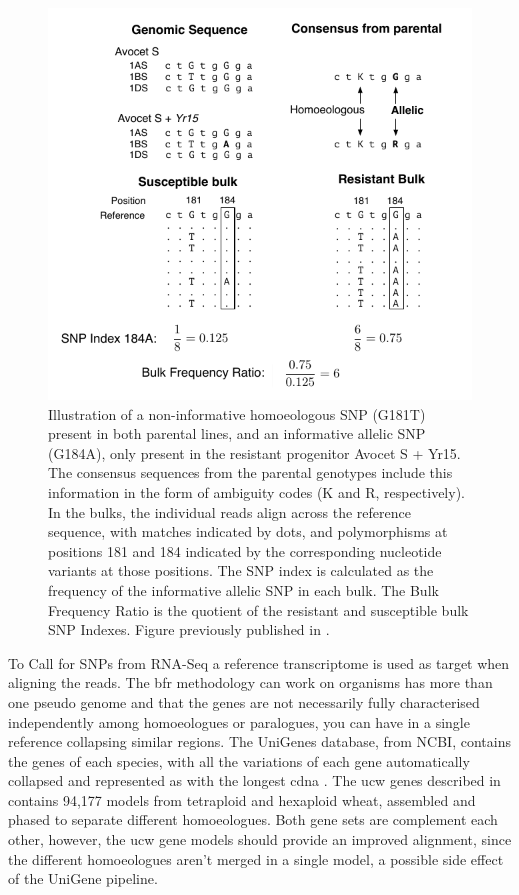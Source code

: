 \begin{figure}
\includegraphics[width=1\textwidth]{Yr15/Figures/bfr.pdf}
\caption{Illustration of a non-informative homoeologous SNP (G181T) present in both parental lines, and an informative allelic SNP (G184A), only present in the resistant progenitor Avocet S + Yr15. The consensus sequences from the parental genotypes include this information in the form of ambiguity codes (K and R, respectively). In the bulks, the individual reads align across the reference sequence, with matches indicated by dots, and polymorphisms at positions 181 and 184 indicated by the corresponding nucleotide variants at those positions. The SNP index is calculated as the frequency of the informative allelic SNP in each bulk. The Bulk Frequency Ratio is the quotient of the resistant and susceptible bulk SNP Indexes. Figure previously published in \citet{Ramirez-Gonzalez2015c}. }
\label{fig:yr15:bfr}
\end{figure}


To Call for SNPs from RNA-Seq a reference transcriptome is used as target when aligning the reads. 
The \gls{bfr} methodology can work on organisms has more than one pseudo genome and that the genes are not necessarily fully characterised independently among homoeologues or paralogues, you can have in a single reference collapsing similar regions. 
The UniGenes database, from NCBI, contains the genes of each species, with all the variations of each gene automatically collapsed and represented as with the longest \acrshort{cdna} \citep{PontiusJUWagnerL2002}. 
The \acrshort{ucw}  genes described in \citet{Krasileva2013} contains 94,177 models from tetraploid and hexaploid wheat, assembled and phased to separate different homoeologues. 
Both gene sets are complement each other, however, the \acrshort{ucw} gene models should provide an improved alignment, since the different homoeologues aren't merged in a single model, a possible side effect of the UniGene pipeline. 


